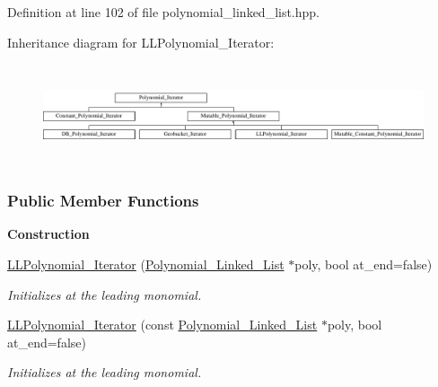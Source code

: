 Definition at line 102 of file polynomial\+\_\+linked\+\_\+list.\+hpp.

Inheritance diagram for L\+L\+Polynomial\+\_\+\+Iterator\+:\begin{figure}[H]
\begin{center}
\leavevmode
\includegraphics[height=3.000000cm]{group___iterator_group}
\end{center}
\end{figure}
\subsubsection*{Public Member Functions}
\begin{Indent}\textbf{ Construction}\par
\begin{DoxyCompactItemize}
\item 
\mbox{\label{group___iterator_group_aef49d7f26dd804b0ab0affbe1567fd07}} 
\hyperlink{group___iterator_group_aef49d7f26dd804b0ab0affbe1567fd07}{L\+L\+Polynomial\+\_\+\+Iterator} (\hyperlink{group__polygroup_class_polynomial___linked___list}{Polynomial\+\_\+\+Linked\+\_\+\+List} $\ast$poly, bool at\+\_\+end=false)
\begin{DoxyCompactList}\small\item\em Initializes at the leading monomial. \end{DoxyCompactList}\item 
\mbox{\label{group___iterator_group_a957ab5441b10a681f647fe4417b2d373}} 
\hyperlink{group___iterator_group_a957ab5441b10a681f647fe4417b2d373}{L\+L\+Polynomial\+\_\+\+Iterator} (const \hyperlink{group__polygroup_class_polynomial___linked___list}{Polynomial\+\_\+\+Linked\+\_\+\+List} $\ast$poly, bool at\+\_\+end=false)
\begin{DoxyCompactList}\small\item\em Initializes at the leading monomial. \end{DoxyCompactList}\end{DoxyCompactItemize}
\end{Indent}
